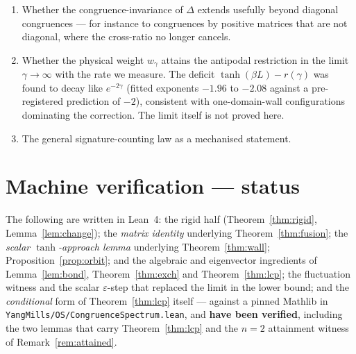 \documentclass[11pt,a4paper]{article}
\theoremstyle{plain}
\theoremstyle{definition}
\begin{document}
\begin{enumerate}
      These two are the whole gap, and they are of different kinds: the first is
      mathematics nobody here has done, the second is plumbing nobody here has
      laid. Only the first would be a discovery.
\item Whether the congruence-invariance of $\Delta$ extends usefully beyond
      diagonal congruences --- for instance to congruences by positive matrices
      that are not diagonal, where the cross-ratio no longer cancels.
\item Whether the physical weight $w_\gamma$ attains the antipodal restriction
      in the limit $\gamma\to\infty$ with the rate we measure. The deficit
      $\tanh(\beta L)-r(\gamma)$ was found to decay like $e^{-2\gamma}$ (fitted
      exponents $-1.96$ to $-2.08$ against a pre-registered prediction of $-2$),
      consistent with one-domain-wall configurations dominating the correction.
      The limit itself is not proved here.
\item The general signature-counting law as a mechanised statement.
\end{enumerate}

\section*{Machine verification --- status}

The following are written in Lean~4: the rigid half
(Theorem~\ref{thm:rigid}, Lemma~\ref{lem:change}); the \emph{matrix identity}
underlying Theorem~\ref{thm:fusion}; the \emph{scalar $\tanh$-approach lemma}
underlying Theorem~\ref{thm:wall}; Proposition~\ref{prop:orbit}; and the
algebraic and eigenvector ingredients of Lemma~\ref{lem:bond},
Theorem~\ref{thm:exch} and Theorem~\ref{thm:lcp}; the fluctuation witness and
the scalar $\varepsilon$-step that replaced the limit in the lower bound; and
the \emph{conditional} form of Theorem~\ref{thm:lcp} itself ---
against a pinned Mathlib in \texttt{YangMills/OS/CongruenceSpectrum.lean}, and
\textbf{have been verified}, including the two lemmas that carry
Theorem~\ref{thm:lcp} and the $n=2$ attainment witness of
Remark~\ref{rem:attained}.
\end{document}
